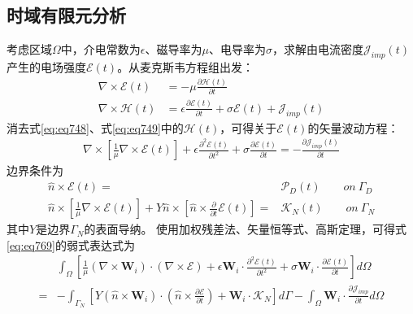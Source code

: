 \documentclass{article}
\numberwithin{equation}{section}
\renewcommand{\vec}[1]{\boldsymbol{#1}}
\begin{document}
\subsection{时域有限元分析}
考虑区域$\Omega$中，介电常数为$\epsilon$、磁导率为$\mu$、电导率为$\sigma$，求解由电流密度$\vec{\mathcal{J}}_{imp}(t)$产生的电场强度$\vec{\mathcal{E}}(t)$。从麦克斯韦方程组出发：
\begin{align}
    \label{eq:eq748}
    \nabla \times \vec{\mathcal{E}}(t)&=-\mu\frac{\partial\vec{\mathcal{H}}(t)}{\partial t} \\
    \label{eq:eq749}
    \nabla \times \vec{\mathcal{H}}(t)&=\epsilon\frac{\partial\vec{\mathcal{E}}(t)}{\partial t}+\sigma\vec{\mathcal{E}}(t)+\vec{\mathcal{J}}_{imp}(t)
\end{align}
消去式\ref{eq:eq748}、式\ref{eq:eq749}中的$\vec{\mathcal{H}}(t)$，可得关于$\vec{\mathcal{E}}(t)$的矢量波动方程：
\begin{align}
    \label{eq:eq769}
    \nabla\times\left[\frac{1}{\mu}\nabla\times\vec{\mathcal{E}}(t)\right]+\epsilon\frac{\partial^2\vec{\mathcal{E}}(t)}{\partial t^2}+\sigma\frac{\partial \vec{\mathcal{E}}(t)}{\partial t}=-\frac{\partial \vec{\mathcal{J}}_{imp}(t)}{\partial t}
\end{align}
边界条件为
\begin{align}
    \label{eq:eq767}
    \hat{n} \times \vec{\mathcal{E}}(t)=&\vec{\mathcal{P}}_D(t) \qquad on~\Gamma_D \\
    \label{eq:eq768}
    \hat{n} \times \left[\frac{1}{\mu}\nabla\times\vec{\mathcal{E}}(t)\right]+Y\hat{n}\times\left[\hat{n}\times\frac{\partial}{\partial t}\vec{\mathcal{E}}(t)\right]=&\vec{\mathcal{K}}_N(t) \qquad on~\Gamma_N
\end{align}
其中$Y$是边界$\Gamma_N$的表面导纳。
使用加权残差法、矢量恒等式、高斯定理，可得式\ref{eq:eq769}的弱式表达式为
\begin{align}
    \label{eq:eq770}
     &\int_{\Omega}\left[\frac{1}{\mu}\left(\nabla\times\mathbf{W}_i\right)\cdot\left(\nabla\times\vec{\mathcal{E}}\right)+\epsilon\mathbf{W}_i\cdot\frac{\partial^2\vec{\mathcal{E}}(t)}{\partial t^2}+\sigma\mathbf{W}_i\cdot\frac{\partial \vec{\mathcal{E}}(t)}{\partial t}\right]d\Omega \nonumber \\
    =&-\int_{\Gamma_N}\left[Y(\hat{n}\times\mathbf{W}_i)\cdot\left(\hat{n}\times\frac{\partial \vec{\mathcal{E}}}{\partial t}\right)+\mathbf{W}_i\cdot\vec{\mathcal{K}}_N\right]d\Gamma-\int_{\Omega}\mathbf{W}_i\cdot\frac{\partial \vec{\mathcal{J}}_{imp}}{\partial t}d\Omega
\end{align}
\end{document}

